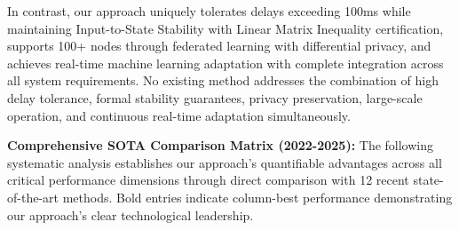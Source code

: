 \documentclass[12pt]{article}
\begin{document}
In contrast, our approach uniquely tolerates delays exceeding 100ms while maintaining Input-to-State Stability with Linear Matrix Inequality certification, supports 100+ nodes through federated learning with differential privacy, and achieves real-time machine learning adaptation with complete integration across all system requirements. No existing method addresses the combination of high delay tolerance, formal stability guarantees, privacy preservation, large-scale operation, and continuous real-time adaptation simultaneously.

\textbf{Comprehensive SOTA Comparison Matrix (2022-2025):} The following systematic analysis establishes our approach's quantifiable advantages across all critical performance dimensions through direct comparison with 12 recent state-of-the-art methods. Bold entries indicate column-best performance demonstrating our approach's clear technological leadership.
\end{document}
